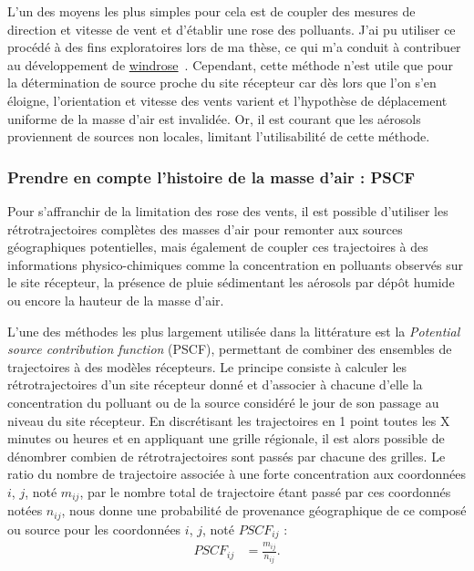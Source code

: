 L'un des moyens les plus simples pour cela est de coupler des mesures de direction et
vitesse de vent et d'établir une rose des polluants. J'ai pu utiliser ce procédé à des
fins exploratoires lors de ma thèse, ce qui m'a conduit à contribuer au développement de
\href{https://github.com/python-windrose/windrose/}{windrose}~\autocite{scls19frPythonwindrose2019}.
Cependant, cette méthode n'est utile que pour la détermination de source proche du site
récepteur car dès lors que l'on s'en éloigne, l'orientation et vitesse des vents varient
et l'hypothèse de déplacement uniforme de la masse d'air est invalidée.  Or, il est
courant que les aérosols proviennent de sources non locales, limitant l'utilisabilité de
cette méthode.


\subsubsection{Prendre en compte l'histoire de la masse d'air : PSCF}%
\label{sub:prendre_en_compte_l_histoire_de_la_masse_d_air_PSCF}

Pour s'affranchir de la limitation des rose des vents, il est possible d'utiliser les
rétrotrajectoires complètes des masses d'air pour remonter aux sources géographiques
potentielles, mais également de coupler ces trajectoires à des informations
physico-chimiques comme la concentration en polluants observés sur le site récepteur, la
présence de pluie sédimentant les aérosols par dépôt humide ou encore la hauteur de la
masse d'air.

L'une des méthodes les plus largement utilisée dans la littérature est la \textit{Potential
source contribution function} (PSCF), permettant de combiner des ensembles de trajectoires à
des modèles récepteurs. Le principe consiste à calculer les rétrotrajectoires d'un site
récepteur donné et d'associer à chacune d'elle la concentration du polluant ou de la
source considéré le jour de son passage au niveau du site récepteur. En discrétisant les
trajectoires en 1 point toutes les X minutes ou heures et en appliquant une grille
régionale, il est alors possible de dénombrer combien de rétrotrajectoires sont passés par
chacune des grilles.  Le ratio du nombre de trajectoire associée à une forte concentration
aux coordonnées $i$, $j$, noté $m_{ij}$, par le nombre total de trajectoire étant passé
par ces coordonnés notées $n_{ij}$, nous donne une probabilité de provenance géographique
de ce composé ou source pour les coordonnées $i$, $j$, noté $PSCF_{ij}$ :
\begin{align}
    \label{eq:PSCF}
    PSCF_{ij} &= \frac{m_{ij}}{n_{ij}}.
\end{align}

